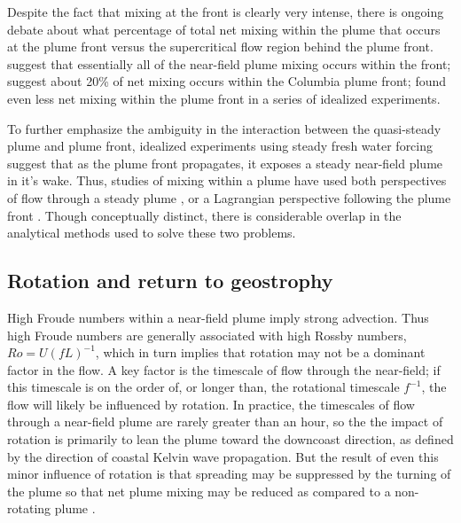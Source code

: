\documentclass[12pt]{article}
\begin{document}
Despite the fact that mixing at the front is clearly very intense, there is ongoing debate about what percentage of total net mixing within the plume that occurs at the plume front versus the supercritical flow region behind the plume front. \citet{pritchard.huntley:06} suggest that essentially all of the near-field plume mixing occurs within the front; \citet{orton.jay:05} suggest about 20\% of net mixing occurs within the Columbia plume front; \citet{cole:14} found even less net mixing within the plume front in a series of idealized experiments.

To further emphasize the ambiguity in the interaction between the quasi-steady plume and plume front, idealized experiments using steady fresh water forcing suggest that as the plume front propagates, it exposes a steady near-field plume in it's wake. Thus, studies of mixing within a plume have used both perspectives of flow through a steady plume \citep{hetland:10a}, or a Lagrangian perspective following the plume front \citep{jay:??}. Though conceptually distinct, there is considerable overlap in the analytical methods used to solve these two problems.

\subsection{Rotation and return to geostrophy}

High Froude numbers within a near-field plume imply strong advection. Thus high Froude numbers are generally associated with high Rossby numbers, $Ro = U (f L)^{-1}$, which in turn implies that rotation may not be a dominant factor in the flow. A key factor is the timescale of flow through the near-field; if this timescale is on the order of, or longer than, the rotational timescale $f^{-1}$, the flow will likely be influenced by rotation. In practice, the timescales of flow through a near-field plume are rarely greater than an hour, so the the impact of rotation is primarily to lean the plume toward the downcoast direction, as defined by the direction of coastal Kelvin wave propagation. But the result of even this minor influence of rotation is that spreading may be suppressed by the turning of the plume so that net plume mixing may be reduced as compared to a non-rotating plume \citep{cole.hetland:16}.


\end{document}
